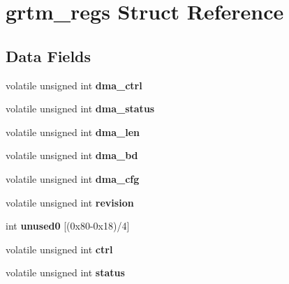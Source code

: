 \hypertarget{structgrtm__regs}{}\section{grtm\+\_\+regs Struct Reference}
\label{structgrtm__regs}
\subsection*{Data Fields}
\begin{DoxyCompactItemize}
\item 
\mbox{\label{structgrtm__regs_a655107f5972021e78b333ca39332a63b}} 
volatile unsigned int {\bfseries dma\+\_\+ctrl}
\item 
\mbox{\label{structgrtm__regs_ae36bdc8fb109e071d28fd89c3afcc3f7}} 
volatile unsigned int {\bfseries dma\+\_\+status}
\item 
\mbox{\label{structgrtm__regs_ad5a0ff548305f77e8fb53609d23e87eb}} 
volatile unsigned int {\bfseries dma\+\_\+len}
\item 
\mbox{\label{structgrtm__regs_a35fd31a11d3555401fb62da555b024a9}} 
volatile unsigned int {\bfseries dma\+\_\+bd}
\item 
\mbox{\label{structgrtm__regs_ae598ccba655736c8ceb64f5a69c2be45}} 
volatile unsigned int {\bfseries dma\+\_\+cfg}
\item 
\mbox{\label{structgrtm__regs_a4af0e4d86b7e70db5acb0d49006ac56f}} 
volatile unsigned int {\bfseries revision}
\item 
\mbox{\label{structgrtm__regs_aeedcaeab1e2ffd4b3ffe73a586145f22}} 
int {\bfseries unused0} \mbox{[}(0x80-\/0x18)/4\mbox{]}
\item 
\mbox{\label{structgrtm__regs_ae4757b2e8b1eed232d0c7afeda81b25e}} 
volatile unsigned int {\bfseries ctrl}
\item 
\mbox{\label{structgrtm__regs_a137c6aa172964a6c096a14cf2a8167e1}} 
volatile unsigned int {\bfseries status}
\item 

\end{DoxyCompactItemize}
